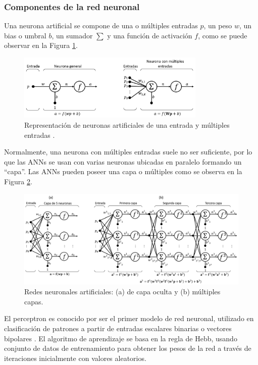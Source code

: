  \subsubsection{Componentes de la red neuronal}

 Una neurona artificial se compone de una o múltiples entradas $p$, un peso $w$, un bias o umbral $b$, un sumador $\sum$ y una función de activación $f$, como se puede observar en la Figura \ref{fig:Neu_Diag}. 

 \begin{figure}[!h]
     \centering
     \includegraphics[width=0.8\textwidth]
     {Imagenes/Neu_Diag.png}
     \caption{Representación de neuronas artificiales de una entrada y múltiples entradas \citep{NeuronalNet2014}.}
     \label{fig:Neu_Diag}
 \end{figure}

 Normalmente, una neurona con múltiples entradas suele no ser suficiente, por lo que las ANNs se usan con varias neuronas ubicadas en paralelo formando un “capa”. Las ANNs pueden poseer una capa o múltiples como se observa en la Figura \ref{fig:Net_conjunt}.

  \begin{figure}[!h]
     \centering
     \includegraphics[width=.9\textwidth]{Imagenes/ConjuntoANN.png}
     \caption{Redes neuronales artificiales: (a) de capa oculta y (b) múltiples capas.}
     \label{fig:Net_conjunt}
 \end{figure}


El perceptron es conocido por ser el primer modelo de red neuronal, utilizado en clasificación de patrones a partir de entradas escalares binarias o vectores bipolares \citep{rosenblatt1958perceptron}. El algoritmo de aprendizaje se basa en la regla de Hebb, usando conjunto de datos de entrenamiento  para obtener los pesos de la red a través de iteraciones inicialmente con valores aleatorios.

